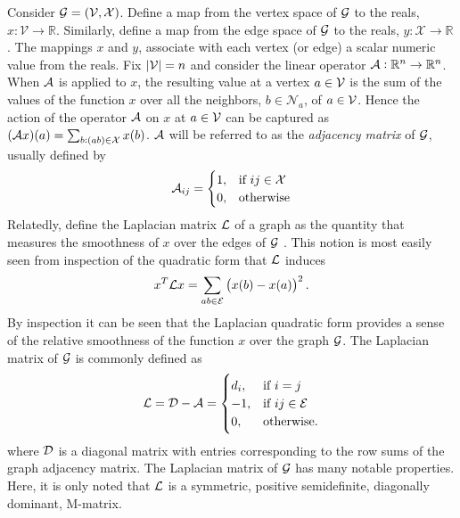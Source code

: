 \documentclass[letterpaper, 11 pt, conference]{ieeeconf}  %
\begin{document}
Consider $\mathcal{G} = (\mathcal{V},\mathcal{X})$. Define a map from the vertex space of $\mathcal{G}$ to the reals, $x: \mathcal{V} \rightarrow \mathbb{R}$. Similarly, define a map from the edge space of $\mathcal{G}$ to the reals, $y: \mathcal{X} \rightarrow \mathbb{R}$. The mappings $x$ and $y$, associate with each vertex (or edge) a scalar numeric value from the reals. Fix $|\mathcal{V}|=n$ and consider the linear operator $\mathcal{A}:\mathbb{R}^n \rightarrow \mathbb{R}^n$. When $\mathcal{A}$ is applied to $x$, the resulting value at a vertex $a \in \mathcal{V}$ is the sum of the values of the function $x$ over all the neighbors, $b \in \mathcal{N}_a$, of $a \in \mathcal{V}$.  Hence the action of the operator $\mathcal{A}$ on $x$ at $a \in \mathcal{V}$ can be captured as $(\mathcal{A} x)(a) = \sum_{b:(ab) \in \mathcal{X}} x(b)$. $\mathcal{A}$ will be referred to as the \textit{adjacency matrix} of $\mathcal{G}$, usually defined by
\begin{align*}
 \mathcal{A}_{ij}= 
\begin{cases}
    1,              & \text{if } ij\in \mathcal{X}\\
    0,              & \text{otherwise}
\end{cases}
\end{align*}
Relatedly, define the Laplacian matrix $\mathcal{L}$ of a graph as the quantity that measures the smoothness of $x$ over the edges of $\mathcal{G}$ \cite{spielman_spectral_2011}. This notion is most easily seen from inspection of the quadratic form that $\mathcal{L}$ induces
\begin{align*}
x^T \mathcal{L} x = \sum_{ab \in \mathcal{E}} \left( x(b) - x(a) \right )^2.
\end{align*}
By inspection it can be seen that the Laplacian quadratic form provides a sense of the relative smoothness of the function $x$ over the graph $\mathcal{G}$. The Laplacian matrix of $\mathcal{G}$ is commonly defined as
\begin{align*}
\mathcal{L} = \mathcal{D} - \mathcal{A} = 
\begin{cases}
d_i, & \text{if } i = j \\
-1,  & \text{if } ij \in \mathcal{E} \\
0,   & \text{otherwise.}
\end{cases}
\end{align*}
where $\mathcal{D}$ is a diagonal matrix with entries corresponding to the row sums of the graph adjacency matrix. The Laplacian matrix of $\mathcal{G}$ has many notable properties.  Here, it is only noted that $\mathcal{L}$ is a symmetric, positive semidefinite, diagonally dominant, M-matrix. 

\end{document}
